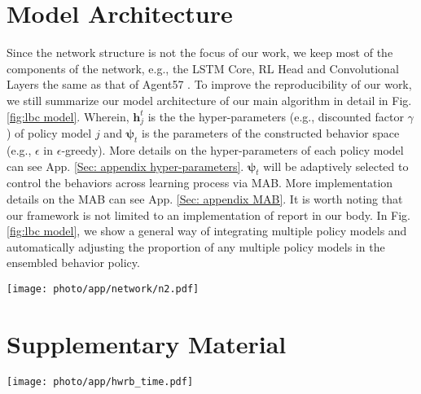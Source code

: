 \clearpage





\section{Model Architecture}
\label{app: Model Architecture}



Since the network structure is not the focus of our work, we keep most of the components of the network, e.g., the LSTM Core, RL Head and Convolutional Layers the same as that of Agent57 \citep{agent57}. To improve the reproducibility of our work, we still summarize our  model architecture of our main algorithm in detail in Fig. \ref{fig:lbc model}.  Wherein, $\mathbf{h}_j^t$ is the the hyper-parameters (e.g., discounted factor $\gamma$ ) of policy model $j$ and $\bm{\bm{\psi}}_t$ is the parameters of the constructed behavior space (e.g., $\epsilon$ in $\epsilon$-greedy). More details on the hyper-parameters of each policy model can see App. \ref{Sec: appendix hyper-parameters}. $\bm{\bm{\psi}}_t$ will be adaptively selected to control the behaviors across learning process via MAB. More implementation details on the MAB can see App. \ref{Sec: appendix MAB}. It is worth noting that our framework is not limited to an implementation of report in our body. In Fig. \ref{fig:lbc model}, we show a general way of integrating multiple policy models and automatically adjusting the proportion of any multiple policy  models in the ensembled behavior policy.
 


\begin{figure*}[!ht]
	\centering
\texttt{[image: photo/app/network/n2.pdf]}
	\centering
\caption{Model Architecture of our main algorithm.}
\label{fig:lbc model}
\end{figure*}


\clearpage


\section{Supplementary Material}
\label{app: Supplementary Material}


\begin{figure*}[!ht]
	\centering
\texttt{[image: photo/app/hwrb\_time.pdf]}
	\centering
\caption{Human World Records Breakthrough of Atari RL Benchmarks.}
\label{fig:hwrb benchmark}
\end{figure*}



